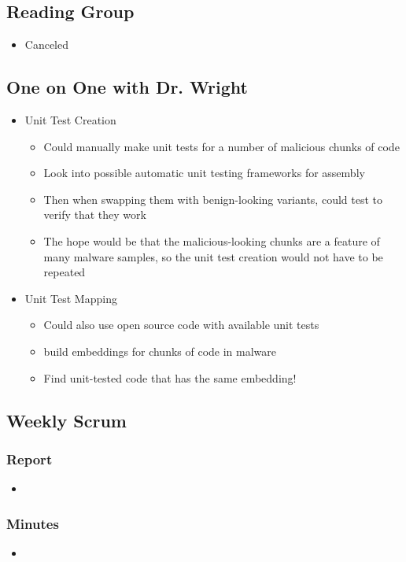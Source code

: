 \documentclass{article}
\begin{document}
\subsection*{Reading Group}
\begin{itemize}
	\item Canceled
\end{itemize}

\subsection*{One on One with Dr. Wright}
\begin{itemize}
	\item Unit Test Creation
	\begin{itemize}
		\item Could manually make unit tests for a number of malicious chunks of code
		\item Look into possible automatic unit testing frameworks for assembly
		\item Then when swapping them with benign-looking variants, could test to verify that they work
		\item The hope would be that the malicious-looking chunks are a feature of many malware samples, so the unit test creation would not have to be repeated
	\end{itemize}
	\item Unit Test Mapping
	\begin{itemize}
		\item Could also use open source code with available unit tests
		\item build embeddings for chunks of code in malware
		\item Find unit-tested code that has the same embedding!
	\end{itemize}
\end{itemize}

\subsection*{Weekly Scrum}
\subsubsection*{Report}
\begin{itemize}
	\item 
\end{itemize}
\subsubsection*{Minutes}
\begin{itemize}
	\item 
\end{itemize}
\end{document}
